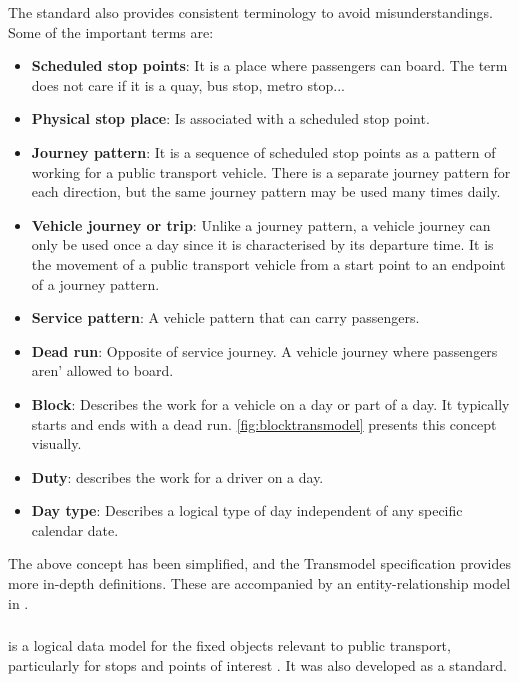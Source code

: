 The standard also provides consistent terminology to avoid misunderstandings. Some of the important terms are:
\begin{itemize}
    \item \textbf{Scheduled stop points}: It is a place where passengers can board. The term does not care if it is a quay, bus stop, metro stop...
    \item \textbf{Physical stop place}: Is associated with a scheduled stop point.
    \item \textbf{Journey pattern}: It is a sequence of scheduled stop points as a pattern of working for a public transport vehicle. There is a separate journey pattern for each direction, but the same journey pattern may be used many times daily.
    \item \textbf{Vehicle journey or trip}: Unlike a journey pattern, a vehicle journey can only be used once a day since it is characterised by its departure time. It is the movement of a public transport vehicle from a start point to an endpoint of a journey pattern.
    \item \textbf{Service pattern}: A vehicle pattern that can carry passengers.
    \item \textbf{Dead run}: Opposite of service journey. A vehicle journey where passengers aren' allowed to board. 
    \item \textbf{Block}: Describes the work for a vehicle on a day or part of a day. It typically starts and ends with a dead run. \autoref{fig:blocktransmodel} presents this concept visually.
    \item \textbf{Duty}: describes the work for a driver on a day. 
    \item \textbf{Day type}: Describes a logical type of day independent of any specific calendar date. 
\end{itemize}

The above concept has been simplified, and the Transmodel specification provides more in-depth definitions. These are accompanied by an entity-relationship model in .


\subsubsection{}
 is a logical data model for the fixed objects relevant to public transport, particularly for stops and points of interest \cite{noauthor_ifopt_nodate}. It was also developed as a  standard.

